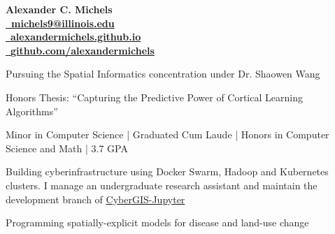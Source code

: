 \documentclass{acmresume}
\begin{document}
	
	\begin{multicols}{2}
		\vspace*{.1cm}
		\textbf{\Huge Alexander C. Michels}\\ \columnbreak
        \hfill\href{mailto:alexandercm4297@gmail.com}{\textbf{\faEnvelope~michels9@illinois.edu}} \\
        \hfill\href{http://alexandermichels.github.io}{\faGlobeAmericas~\textbf{alexandermichels.github.io}} \\
        \hfill\href{https://github.com/alexandermichels}{\faGithub~\textbf{github.com/alexandermichels}}
	\end{multicols}
	
	
		\begin{titemize}
			\item{Pursuing the Spatial Informatics concentration under Dr. Shaowen Wang}
		\end{titemize}

        \begin{titemize}
            \item Honors Thesis: ``Capturing the Predictive Power of Cortical Learning Algorithms''
            \item{Minor in Computer Science | Graduated Cum Laude | Honors in Computer Science and Math | 3.7 GPA}
        \end{titemize}
	
	
        \begin{titemize}
            \item Building cyberinfrastructure using Docker Swarm, Hadoop and Kubernetes clusters. I manage an undergraduate research assistant and maintain the development branch of \href{https://cybergis.illinois.edu/project/cybergis-jupyter/}{CyberGIS-Jupyter}
            \item Programming spatially-explicit models for disease and land-use change
        \end{titemize}
		
\end{document}
